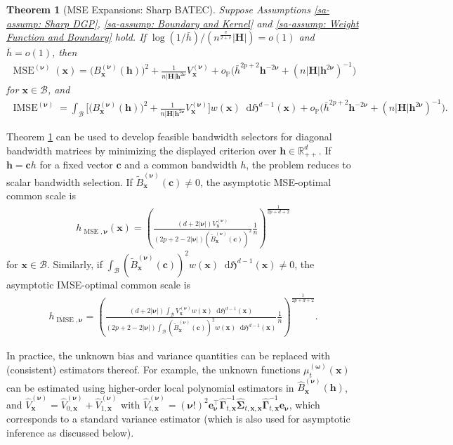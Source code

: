 \documentclass[10pt]{article}
\newtheorem{thm}{Theorem}
\renewcommand{\P}{\mathbb{P}}
\newcommand{\Haus}{\mathfrak{H}}
\newcommand{\dif}{\mathop{}\!\mathrm{d}}
\newcommand{\bc}{\mathbf{c}}
\newcommand{\be}{\mathbf{e}}
\newcommand{\bh}{\mathbf{h}}
\newcommand{\bH}{\mathbf{H}}
\newcommand{\bx}{\mathbf{x}}
\newcommand{\bnu}{\boldsymbol{\nu}}
\newcommand{\bomega}{\boldsymbol{\omega}}
\newcommand{\bGamma}{\boldsymbol{\Gamma}}
\newcommand{\bSigma}{\boldsymbol{\Sigma}}
\newcommand{\B}{\mathcal{B}}
\begin{document}
\begin{thm}[MSE Expansions: Sharp BATEC]\label{sa-thm: MSE Expansions: Sharp BATEC}
    Suppose Assumptions \ref{sa-assump: Sharp DGP}, \ref{sa-assump: Boundary and Kernel} and \ref{sa-assump: Weight Function and Boundary} hold. If $\log(1/\bar{h})/(n^{\frac{v}{2+v}} |\bH|) = o(1)$ and $\bar{h} = o(1)$, then
    \begin{align*}
        \operatorname{MSE}^{(\bnu)}(\bx)
        = \big(B_{\bx}^{(\bnu)}(\bh)\big)^2
          + \frac{1}{n|\bH|\bh^{2\bnu}} V_{\bx}^{(\bnu)}
          + o_{\P} \big(\bar{h}^{2p+2}\bh^{-2\bnu} + (n|\bH|\bh^{2\bnu})^{-1}\big)
    \end{align*}
    for $\bx \in \B$, and
    \begin{align*}
        \operatorname{IMSE}^{(\bnu)}
        = \int_{\B} \big[ \big(B_{\bx}^{(\bnu)}(\bh)\big)^2
           + \frac{1}{n|\bH|\bh^{2\bnu}} V_{\bx}^{(\bnu)} \big] w(\bx) \dif\Haus^{d-1}(\bx)
           + o_{\P} \big(\bar{h}^{2p+2}\bh^{-2\bnu} + (n|\bH|\bh^{2\bnu})^{-1}\big).
    \end{align*}
\end{thm}

Theorem \ref{sa-thm: MSE Expansions: Sharp BATEC} can be used to develop feasible bandwidth selectors for diagonal bandwidth matrices by minimizing the displayed criterion over $\bh\in\mathbb{R}_{++}^d$. If $\bh = \bc h$ for a fixed vector $\bc$ and a common bandwidth $h$, the problem reduces to scalar bandwidth selection. If $\widetilde B_{\bx}^{(\bnu)}(\bc)\neq0$, the asymptotic MSE-optimal common scale is
\begin{align*}
    h_{\operatorname{MSE},\bnu}(\bx)
    = \left(\frac{(d + 2|\bnu|) V_{\bx}^{(\bnu)}}
                 {(2p+2 - 2 |\bnu|) (\widetilde B_{\bx}^{(\bnu)}(\bc))^2} \frac{1}{n}\right)^{\frac{1}{2p+d+2}}
\end{align*}
for $\bx \in \B$. Similarly, if $\int_{\B} (\widetilde B_{\bx}^{(\bnu)}(\bc))^2 w(\bx)\dif\Haus^{d-1}(\bx) \neq 0$, the asymptotic IMSE-optimal common scale is
\begin{align*}
    h_{\operatorname{IMSE},\bnu}
    = \left(\frac{(d + 2 |\bnu|) \int_{\B} V_{\bx}^{(\bnu)} w(\bx)\dif\Haus^{d-1}(\bx)}
                 {(2p+2 - 2|\bnu|) \int_{\B} (\widetilde B_{\bx}^{(\bnu)}(\bc))^2 w(\bx) \dif\Haus^{d-1}(\bx)} \frac{1}{n}\right)^{\frac{1}{2p+d+2}}.
\end{align*}

In practice, the unknown bias and variance quantities can be replaced with (consistent) estimators thereof. For example, the unknown functions $\mu_t^{(\bomega)}(\bx)$ can be estimated using higher-order local polynomial estimators in $\widehat{B}_{\bx}^{(\bnu)}(\bh)$, and
$\widehat{V}_{\bx}^{(\bnu)} = \widehat{V}_{0,\bx}^{(\bnu)} + \widehat{V}_{1,\bx}^{(\bnu)}$
with
$\widehat{V}_{t,\bx}^{(\bnu)} = (\bnu!)^2\be_{\bnu}^{\top} \widehat{\bGamma}_{t,\bx}^{-1} \widehat{\bSigma}_{t,\bx,\bx} \widehat{\bGamma}_{t,\bx}^{-1}\be_{\bnu}$, which corresponds to a standard variance estimator (which is also used for asymptotic inference as discussed below).
\end{document}
